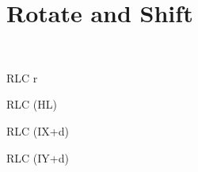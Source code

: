 \section{Rotate and Shift}

\vspace*{0.7ex} %
\begin{minipage}{\textwidth}
	
\begin{instrtable}
	\\[-10pt]

	\begin{instruction}{RLC r}
			\FlagsRLCr
		\SkipToOpCode 
	\end{instruction}

	\begin{instruction}{RLC (HL)}
			\FlagsRLCr
		\SkipToOpCode 
	\end{instruction}

	\begin{instruction}{RLC (IX+d)}
			\FlagsRLCr
		\SkipToOpCode 
		\SkipToOpCode 
		\SkipToOpCode 
	\end{instruction}

	\begin{instruction}{RLC (IY+d)}
			\FlagsRLCr
		\SkipToOpCode 
		\SkipToOpCode 
		\SkipToOpCode 
	\end{instruction}


\end{instrtable}
\end{minipage}
